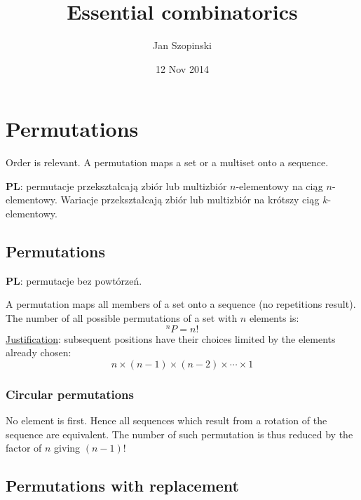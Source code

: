\documentclass{article}
\begin{document}
\title{Essential combinatorics}
\author{Jan Szopinski}
\date{12 Nov 2014}
\maketitle

\section{Permutations}

Order is relevant. A permutation maps a set or a multiset onto a sequence.

\textbf{PL}: permutacje przekształcają zbiór lub multizbiór $n$\nobreakdash-\hspace{0pt}elementowy na ciąg $n$\nobreakdash-\hspace{0pt}elementowy.
Wariacje przekształcają zbiór lub multizbiór na krótszy ciąg $k$\nobreakdash-\hspace{0pt}elementowy.

\subsection{Permutations}

\textbf{PL}: permutacje bez powtórzeń.

A permutation maps all members of a set onto a sequence (no repetitions result).
The number of all possible permutations of a set with $n$ elements is:
\begin{equation}
    ^nP = n!
\end{equation}
\underline{Justification}: subsequent positions have their choices limited by the elements already chosen:
\begin{equation*}
    n\times(n-1)\times(n-2)\times \dotsb \times 1
\end{equation*}

\subsubsection{Circular permutations}

No element is first.
Hence all sequences which result from a rotation of the sequence are equivalent.
The number of such permutation is thus reduced by the factor of $n$ giving ${(n-1)!}$

\subsection{Permutations with replacement}
\end{document}
